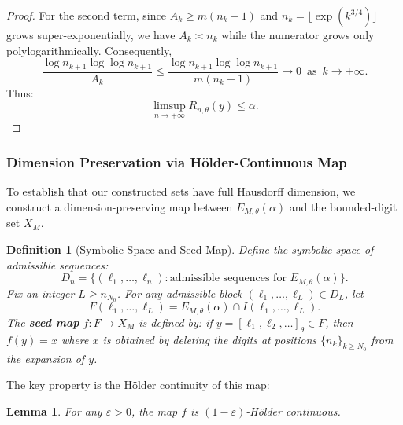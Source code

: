 \documentclass{article}
\newtheorem{lemma}[theorem]{Lemma}
\newtheorem{definition}[theorem]{Definition}
\numberwithin{equation}{section}
\begin{document}
\begin{proof}
For the second term, since $A_k \geq m(n_k - 1)$ and $n_k = \lfloor \exp(k^{3/4}) \rfloor$ grows super-exponentially, we have { $A_k \asymp n_k$ while the numerator grows only polylogarithmically. Consequently,}
\[
\frac{\log n_{k+1} \log \log n_{k+1}}{A_k} \leq \frac{\log n_{k+1} \log \log n_{k+1}}{m(n_k - 1)} \to 0 \, {\text{ as } \, k \to +\infty}.
\]
Thus:
\[
\limsup_{n \to +\infty} R_{n,\theta}(y) \leq \alpha.
\]
\end{proof}

\subsubsection{Dimension Preservation via Hölder-Continuous Map}

To establish that our constructed sets have full Hausdorff dimension, we construct a dimension-preserving map between $E_{M,\theta}(\alpha)$ and the bounded-digit set $X_M$.

\begin{definition}[Symbolic Space and Seed Map]
Define the symbolic space of admissible sequences:
\[
D_n = \{ (\ell_1, \ldots, \ell_n) : \text{admissible sequences for } E_{M,\theta}(\alpha) \}.
\]
{Fix an integer $L \ge n_{N_0}$. For any admissible block $(\ell_1, \ldots, \ell_L) \in D_L$, let
\[
F(\ell_1, \ldots, \ell_L) = E_{M,\theta}(\alpha) \cap I(\ell_1, \ldots, \ell_L).
\]
The \textbf{seed map} $f: F \to X_M$ is defined by: if $y = [\ell_1, \ell_2, \ldots]_\theta \in F$, then $f(y) = x$ where $x$ is obtained by deleting the digits at positions $\{n_k\}_{k \geq N_0}$ from the expansion of $y$.}
\end{definition}

The key property is the Hölder continuity of this map:

\begin{lemma}\label{lem:holder_continuity}
For any $\varepsilon > 0$, the map $f$ is $(1-\varepsilon)$-Hölder continuous.
\end{lemma}
\end{document}
